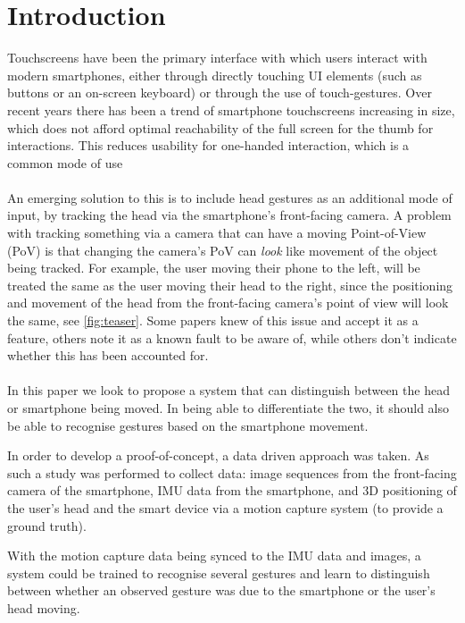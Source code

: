 \section{Introduction} %
Touchscreens have been the primary interface with which users interact with modern smartphones, either through directly touching UI elements (such as buttons or an on-screen keyboard) or through the use of touch-gestures. 
Over recent years there has been a trend of smartphone touchscreens increasing in size\cite{xuesheng2018research}, which does not afford optimal reachability of the full screen for the thumb for interactions\cite{le2018fingers}. This reduces usability for one-handed interaction, which is a common mode of use\cite{hoober2013users}
\\\\
An emerging solution to this is to include head gestures as an additional mode of input, by tracking the head via the smartphone's front-facing camera\cite{gorodnichy2004nouse, deepateep2020facial, voelker2020headreach, roig2015face, hansen2006use, francone2011using}.
A problem with tracking something via a camera that can have a moving Point-of-View (PoV) is that changing the camera's PoV can \textit{look} like movement of the object being tracked.
For example, the user moving their phone to the left, will be treated the same as the user moving their head to the right, since the positioning and movement of the head from the front-facing camera's point of view will look the same, see \autoref{fig:teaser}.
Some papers knew of this issue and accept it as a feature\cite{hansen2006use}, others note it as a known fault to be aware of\cite{francone2011using, varona2008hands}, while others don't indicate whether this has been accounted for\cite{gorodnichy2004nouse, deepateep2020facial, voelker2020headreach,roig2015face}.
\\\\
In this paper we look to propose a system that can distinguish between the head or smartphone being moved. In being able to differentiate the two, it should also be able to recognise gestures based on the smartphone movement.

In order to develop a proof-of-concept, a data driven approach was taken.
As such a study was performed to collect data: image sequences from the front-facing camera of the smartphone, IMU data from the smartphone, and 3D positioning of the user's head and the smart device via a motion capture system (to provide a ground truth).

With the motion capture data being synced to the IMU data and images, a system could be trained to recognise several gestures and learn to distinguish between whether an observed gesture was due to the smartphone or the user's head moving.

